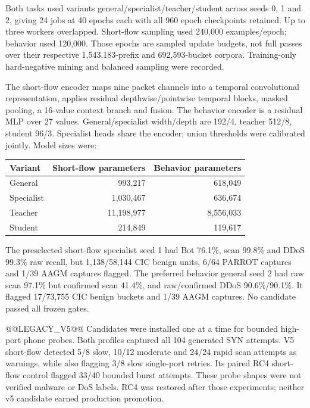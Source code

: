 \documentclass[11pt,a4paper,oneside]{report}
\begin{document}
Both tasks used variants general/specialist/teacher/student across seeds 0, 1 and 2, giving 24 jobs at 40 epochs each with all 960 epoch checkpoints retained. Up to three workers overlapped. Short-flow sampling used 240,000 examples/epoch; behavior used 120,000. Those epochs are sampled update budgets, not full passes over their respective 1,543,183-prefix and 692,593-bucket corpora. Training-only hard-negative mining and balanced sampling were recorded.

The short-flow encoder maps nine packet channels into a temporal convolutional representation, applies residual depthwise/pointwise temporal blocks, masked pooling, a 16-value context branch and fusion. The behavior encoder is a residual MLP over 27 values. General/specialist width/depth are 192/4, teacher 512/8, student 96/3. Specialist heads share the encoder; union thresholds were calibrated jointly. Model sizes were:
\begin{center}\begin{tabular}{lrr}\toprule Variant & Short-flow parameters & Behavior parameters\\\midrule
General & 993,217 & 618,049\\
Specialist & 1,030,467 & 636,674\\
Teacher & 11,198,977 & 8,556,033\\
Student & 214,849 & 119,617\\\bottomrule\end{tabular}\end{center}

The preselected short-flow specialist seed 1 had Bot 76.1\%, scan 99.8\% and DDoS 99.3\% raw recall, but 1,138/58,144 CIC benign units, 6/64 PARROT captures and 1/39 AAGM captures flagged. The preferred behavior general seed 2 had raw scan 97.1\% but confirmed scan 41.4\%, and raw/confirmed DDoS 90.6\%/90.1\%. It flagged 17/73,755 CIC benign buckets and 1/39 AAGM captures. No candidate passed all frozen gates.

@@LEGACY_V5@@
Candidates were installed one at a time for bounded high-port phone probes. Both profiles captured all 104 generated SYN attempts. V5 short-flow detected 5/8 slow, 10/12 moderate and 24/24 rapid scan attempts as warnings, while also flagging 3/8 slow single-port retries. Its paired RC4 short-flow control flagged 33/40 bounded burst attempts. These probe shapes were not verified malware or DoS labels. RC4 was restored after those experiments; neither v5 candidate earned production promotion.
\end{document}
